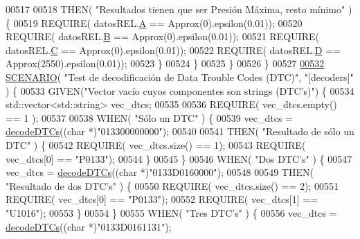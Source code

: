 \begin{DoxyCode}
{00517 
00518             THEN( \textcolor{stringliteral}{"Resultados tienen que ser Presión Máxima, resto mínimo"} ) \{
00519                 REQUIRE( datosREL.\hyperlink{structRelacionesResponse_a560d1e6af01b999625b467ef3f858181}{A} == Approx(0).epsilon(0.01));
00520                 REQUIRE( datosREL.\hyperlink{structRelacionesResponse_a1216f6019af393dd85853f352533ed9d}{B} == Approx(0).epsilon(0.01));
00521                 REQUIRE( datosREL.\hyperlink{structRelacionesResponse_a37feda02f128b77f4f2d61cabcddc9e7}{C} == Approx(0).epsilon(0.01));
00522                 REQUIRE( datosREL.\hyperlink{structRelacionesResponse_ab76f55b12df3754a9bb5b102a1c06cbc}{D} == Approx(2550).epsilon(0.01));
00523             \}
00524         \}
00525     \}
00526 \}
00527 
\hyperlink{UnitTestCase_8cpp_a32f4d6ded472fa78eead34a000bb2bbd}{00532} \hyperlink{UnitTestCase_8cpp_aa6afb62ebdd4c3e07996c995f623eb6b}{SCENARIO}( \textcolor{stringliteral}{"Test de decodificación de Data Trouble Codes (DTC)"}, \textcolor{stringliteral}{"[decoders]"} ) \{
00533     GIVEN(\textcolor{stringliteral}{"Vector vacío cuyos componentes son strings (DTC's)"}) \{
00534         std::vector<std::string> vec\_dtcs;
00535 
00536         REQUIRE( vec\_dtcs.empty() == 1 );
00537 
00538         WHEN( \textcolor{stringliteral}{"Sólo un DTC"} ) \{
00539             vec\_dtcs = \hyperlink{decoders_8cpp_aac9b3d4ea17ee4dbbdf755b0b510137a}{decodeDTCs}((\textcolor{keywordtype}{char} *)\textcolor{stringliteral}{"013300000000"});
00540 
00541             THEN( \textcolor{stringliteral}{"Resultado de sólo un DTC"} ) \{
00542                 REQUIRE( vec\_dtcs.size() == 1);
00543                 REQUIRE( vec\_dtcs[0] == \textcolor{stringliteral}{"P0133"});
00544             \}
00545         \}
00546         WHEN( \textcolor{stringliteral}{"Dos DTC's"} ) \{
00547             vec\_dtcs = \hyperlink{decoders_8cpp_aac9b3d4ea17ee4dbbdf755b0b510137a}{decodeDTCs}((\textcolor{keywordtype}{char} *)\textcolor{stringliteral}{"0133D0160000"});
00548 
00549             THEN( \textcolor{stringliteral}{"Resultado de dos DTC's"} ) \{
00550                 REQUIRE( vec\_dtcs.size() == 2);
00551                 REQUIRE( vec\_dtcs[0] == \textcolor{stringliteral}{"P0133"});
00552                 REQUIRE( vec\_dtcs[1] == \textcolor{stringliteral}{"U1016"});
00553             \}
00554         \}
00555         WHEN( \textcolor{stringliteral}{"Tres DTC's"} ) \{
00556             vec\_dtcs = \hyperlink{decoders_8cpp_aac9b3d4ea17ee4dbbdf755b0b510137a}{decodeDTCs}((\textcolor{keywordtype}{char} *)\textcolor{stringliteral}{"0133D0161131"});
}
\end{DoxyCode}
